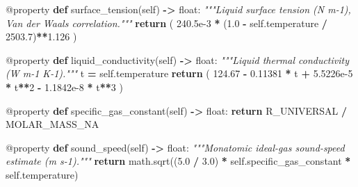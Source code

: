 \documentclass[
  12pt,a4paper,oneside]{report}
\newenvironment{Shaded}{\begin{snugshade}}{\end{snugshade}}
\newcommand{\AttributeTok}[1]{\textcolor[rgb]{0.77,0.63,0.00}{#1}}
\newcommand{\BuiltInTok}[1]{#1}
\newcommand{\CommentTok}[1]{\textcolor[rgb]{0.56,0.35,0.01}{\textit{#1}}}
\newcommand{\ControlFlowTok}[1]{\textcolor[rgb]{0.13,0.29,0.53}{\textbf{#1}}}
\newcommand{\DecValTok}[1]{\textcolor[rgb]{0.00,0.00,0.81}{#1}}
\newcommand{\FloatTok}[1]{\textcolor[rgb]{0.00,0.00,0.81}{#1}}
\newcommand{\KeywordTok}[1]{\textcolor[rgb]{0.13,0.29,0.53}{\textbf{#1}}}
\newcommand{\NormalTok}[1]{#1}
\newcommand{\OperatorTok}[1]{\textcolor[rgb]{0.81,0.36,0.00}{\textbf{#1}}}
\newcommand{\VariableTok}[1]{\textcolor[rgb]{0.00,0.00,0.00}{#1}}
\begin{document}
\begin{Shaded}
\begin{Highlighting}[]
    \AttributeTok{@property}
    \KeywordTok{def}\NormalTok{ surface\_tension(}\VariableTok{self}\NormalTok{) }\OperatorTok{{-}\textgreater{}} \BuiltInTok{float}\NormalTok{:}
        \CommentTok{"""Liquid surface tension (N m{-}1), Van der Waals correlation."""}
        \ControlFlowTok{return}\NormalTok{ (}
            \FloatTok{240.5e{-}3} \OperatorTok{*}\NormalTok{ (}\FloatTok{1.0} \OperatorTok{{-}} \VariableTok{self}\NormalTok{.temperature }\OperatorTok{/} \FloatTok{2503.7}\NormalTok{)}\OperatorTok{**}\FloatTok{1.126}
\NormalTok{        )}

    \AttributeTok{@property}
    \KeywordTok{def}\NormalTok{ liquid\_conductivity(}\VariableTok{self}\NormalTok{) }\OperatorTok{{-}\textgreater{}} \BuiltInTok{float}\NormalTok{:}
        \CommentTok{"""Liquid thermal conductivity (W m{-}1 K{-}1)."""}
\NormalTok{        t }\OperatorTok{=} \VariableTok{self}\NormalTok{.temperature}
        \ControlFlowTok{return}\NormalTok{ (}
            \FloatTok{124.67} \OperatorTok{{-}} \FloatTok{0.11381} \OperatorTok{*}\NormalTok{ t }\OperatorTok{+} \FloatTok{5.5226e{-}5} \OperatorTok{*}\NormalTok{ t}\OperatorTok{**}\DecValTok{2}
            \OperatorTok{{-}} \FloatTok{1.1842e{-}8} \OperatorTok{*}\NormalTok{ t}\OperatorTok{**}\DecValTok{3}
\NormalTok{        )}

    \AttributeTok{@property}
    \KeywordTok{def}\NormalTok{ specific\_gas\_constant(}\VariableTok{self}\NormalTok{) }\OperatorTok{{-}\textgreater{}} \BuiltInTok{float}\NormalTok{:}
        \ControlFlowTok{return}\NormalTok{ R\_UNIVERSAL }\OperatorTok{/}\NormalTok{ MOLAR\_MASS\_NA}

    \AttributeTok{@property}
    \KeywordTok{def}\NormalTok{ sound\_speed(}\VariableTok{self}\NormalTok{) }\OperatorTok{{-}\textgreater{}} \BuiltInTok{float}\NormalTok{:}
        \CommentTok{"""Monatomic ideal{-}gas sound{-}speed estimate (m s{-}1)."""}
        \ControlFlowTok{return}\NormalTok{ math.sqrt((}\FloatTok{5.0} \OperatorTok{/} \FloatTok{3.0}\NormalTok{) }\OperatorTok{*} \VariableTok{self}\NormalTok{.specific\_gas\_constant }\OperatorTok{*} \VariableTok{self}\NormalTok{.temperature)}


\end{Highlighting}
\end{Shaded}
\end{document}
